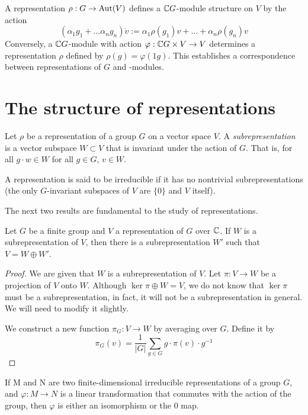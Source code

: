 A representation $\rho : G \rightarrow \operatorname{Aut}(V)$ defines a $\mathbb{C} G$-module structure on $V$ by the action
\[
    (\alpha_1g_1 + ... \alpha_ng_n) \dot v := \alpha_1\rho(g_1)v + ...+ \alpha_n\rho(g_n)v
\]
Conversely, a $\mathbb{C} G$-module with action $\varphi : \mathbb{C} G \times V \rightarrow V$ determines a representation $\rho$ 
defined by $\rho(g) = \varphi(1g)$. This establishes a correspondence between representations of $G$ and 
\CG-modules.


\section{The structure of representations}


\begin{definition}
    Let $\rho$ be a representation of a group $G$ on a vector space $V$. A \emph{subrepresentation} is a vector 
    subspace $W \subset V$ that is invariant under the action of $G$. That is, for all $g\cdot w \in W$ for all $g 
    \in G$, $v \in W$. 
    
    A representation is said to be irreducible if it has no nontrivial subrepresentations (the only $G$-invariant 
    subspaces of $V$ are $\{ 0 \}$ and $V$ itself).
\end{definition}


The next two results are fundamental to the study of representations.


\begin{theorem}
    Let $G$ be a finite group and $V$ a representation of $G$ over $\mathbb{C}$. If $W$ is a subrepresentation of $V$, then 
there is a subrepresentation $W'$ such that $V = W \oplus W'$.  \end{theorem}


\begin{proof}
    We are given that $W$ is a subrepresentation of $V$. Let $\pi : V \rightarrow W$ be a projection of $V$ onto 
    $W$. Although $\ker \pi \oplus W = V$, we do not know that $\ker \pi$ must be a subrepresentation, in fact, it 
    will not be a subrepresentation in general. We will need to modify it slightly.

    We construct a new function $\pi_G : V \rightarrow W$ by averaging over $G$. Define it by
    \[
        \pi_G(v) = \frac{1}{|G|}\sum_{g \in G} g \cdot \pi(v) \cdot g^{-1}
    \]
\end{proof}


\begin{theorem}
    If M and N are two finite-dimensional irreducible representations of a group $G$, and $\varphi:M \to N$ is a 
    linear transformation that commutes with the action of the group, then $\varphi$ is either an isomorphism or 
    the $0$ map.
\end{theorem}

